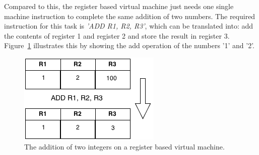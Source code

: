 \newpage
Compared to this, the register based virtual machine just needs one single machine instruction to complete the same addition of two numbers.
The required instruction for this task is \textit{'ADD R1, R2, R3'}, which can be translated into: add the contents of register 1 and register 2 and store the result in register 3.
Figure~\ref{fig:register-based-addition} illustrates this by showing the add operation of the numbers '1' and '2'.
\begin{figure}[h]
\begin{center}
\includegraphics[scale=0.65]{images/register-based-addition.png} 
\caption{The addition of two integers on a register based virtual machine.}
\label{fig:register-based-addition}
\end{center}
\end{figure}

